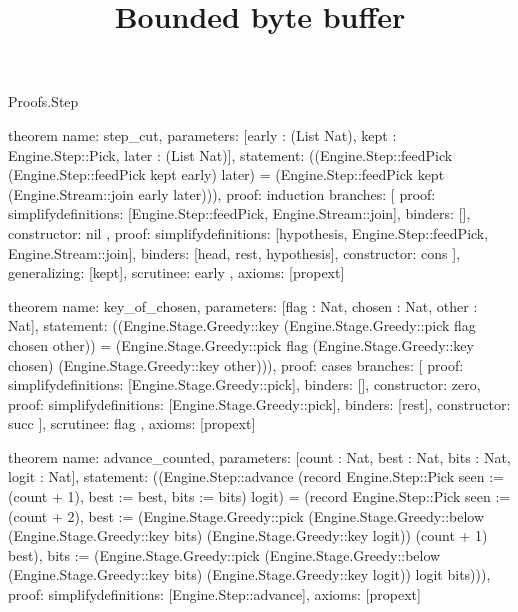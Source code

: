 \begin{lexlean}{Proofs.Step}
\title{Bounded byte buffer}
\begin{semanticmodule}
theorem{
  name: step_cut,
  parameters: [early : (List Nat), kept : Engine.Step::Pick, later : (List Nat)],
  statement: ((Engine.Step::feedPick (Engine.Step::feedPick kept early) later) = (Engine.Step::feedPick kept (Engine.Stream::join early later))),
  proof: induction{
    branches: [
      {
        proof: simplify{definitions: [Engine.Step::feedPick, Engine.Stream::join]},
        binders: [],
        constructor: nil
      },
      {
        proof: simplify{definitions: [hypothesis, Engine.Step::feedPick, Engine.Stream::join]},
        binders: [head, rest, hypothesis],
        constructor: cons
      }
    ],
    generalizing: [kept],
    scrutinee: early
  },
  axioms: [propext]
}

theorem{
  name: key_of_chosen,
  parameters: [flag : Nat, chosen : Nat, other : Nat],
  statement: ((Engine.Stage.Greedy::key (Engine.Stage.Greedy::pick flag chosen other)) = (Engine.Stage.Greedy::pick flag (Engine.Stage.Greedy::key chosen) (Engine.Stage.Greedy::key other))),
  proof: cases{
    branches: [
      {proof: simplify{definitions: [Engine.Stage.Greedy::pick]}, binders: [], constructor: zero},
      {
        proof: simplify{definitions: [Engine.Stage.Greedy::pick]},
        binders: [rest],
        constructor: succ
      }
    ],
    scrutinee: flag
  },
  axioms: [propext]
}

theorem{
  name: advance_counted,
  parameters: [count : Nat, best : Nat, bits : Nat, logit : Nat],
  statement: ((Engine.Step::advance (record Engine.Step::Pick {seen := (count + 1), best := best, bits := bits}) logit) = (record Engine.Step::Pick {seen := (count + 2), best := (Engine.Stage.Greedy::pick (Engine.Stage.Greedy::below (Engine.Stage.Greedy::key bits) (Engine.Stage.Greedy::key logit)) (count + 1) best), bits := (Engine.Stage.Greedy::pick (Engine.Stage.Greedy::below (Engine.Stage.Greedy::key bits) (Engine.Stage.Greedy::key logit)) logit bits)})),
  proof: simplify{definitions: [Engine.Step::advance]},
  axioms: [propext]
}


\end{semanticmodule}
\end{lexlean}
